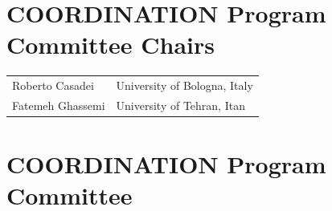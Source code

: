 \documentclass[]{llncs}
\begin{document}
\section*{COORDINATION Program Committee Chairs}

\noindent
\begin{longtable}{p{}p{}}
Roberto Casadei & University of Bologna, Italy\\

Fatemeh Ghassemi & University of Tehran, Itan\\
\end{longtable}


\section*{COORDINATION Program Committee}
\noindent
\end{document}
